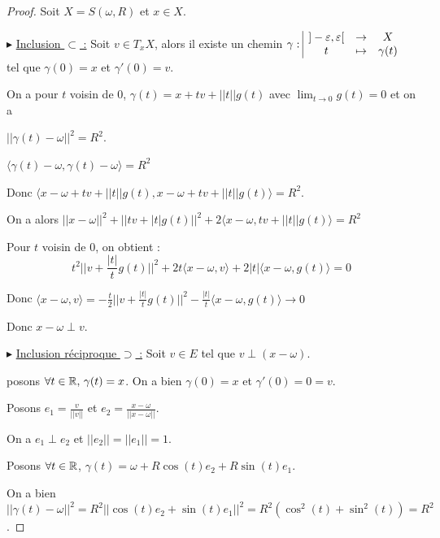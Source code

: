 \begin{proof}
    Soit $X = S(\omega, R)$ et $x \in X$.

    $\blacktriangleright$ \uline{Inclusion $\subset$ :} Soit $v \in T_xX$, alors il existe un chemin $\gamma: \space \begin{array}{|ccc} \displaystyle ]- \varepsilon, \varepsilon[ & \to & \displaystyle X \\ \displaystyle t & \mapsto & \displaystyle \gamma(t) \end{array}$
    tel que $\gamma(0) = x$ et $\gamma'(0) = v$.

    On a pour $t$ voisin de $0$, $\gamma(t) = x + t v + ||t|| g(t)$ avec
    $\displaystyle \lim_{t \to 0} g(t) = 0$ et on a 
    
    $||\gamma(t) - \omega||^2 = R^2$.

    $\langle \gamma(t) - \omega, \gamma(t) - \omega \rangle = R^2$

    Donc $\langle x - \omega + t v + ||t|| g(t), x - \omega + t v + ||t|| g(t) \rangle = R^2$. 

    On a alors $||x - \omega||^2 +  ||tv + |t| g(t)||^2 + 2 \langle x - \omega, t v + ||t|| g(t) \rangle = R^2$

    Pour $t$ voisin de $0$, on obtient : 
    $$t^2 ||v + \frac{|t|}{t} g(t)||^2 + 2 t \langle x - \omega, v \rangle + 2 |t| \langle x - \omega, g(t) \rangle = 0$$

    Donc $\langle x - \omega, v \rangle = - \frac t 2 ||v + \frac{|t|}{t} g(t)||^2 - \frac{|t|}{t} \langle x - \omega, g(t) \rangle \to 0$

    Donc $x- \omega \perp v$.

    \lvspace $\blacktriangleright$ \uline{Inclusion réciproque $\supset$ :} Soit $v \in E$ tel que 
    $v \perp (x - \omega)$. 
    
     posons $\forall t \in \mathbb{R}, \, \gamma(t) = x$. On a 
    bien $\gamma(0) = x$ et $\gamma'(0) = 0 = v$.


    Posons $e_1 = \frac{v}{||v||}$ et $e_2 = \frac{x - \omega}{||x - \omega||}$.

    On a $e_1 \perp e_2$ et $||e_2|| = ||e_1|| = 1$. 


    \lvspace \lvspace

    Posons $\forall t \in \mathbb{R}$, $\gamma(t) = \omega + R \cos(t) e_2 + R \sin(t) e_1$.

    On a bien $||\gamma(t) - \omega||^2 = R^2|| \cos(t) e_2 + \sin(t) e_1||^2 = R^2 (\cos^2(t) + \sin^2(t)) = R^2$.


\end{proof}
